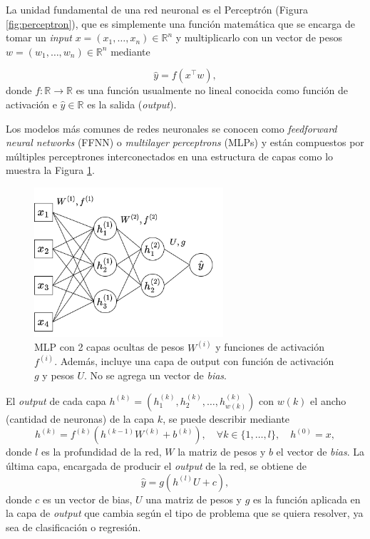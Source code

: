 \vspace{0.2cm}

La unidad fundamental de una red neuronal es el Perceptrón (Figura \ref{fig:perceptron}), que es simplemente una función matemática que se encarga de tomar un \textit{input} $x = (x_1 , \dots , x_n) \in \mathbb{R}^n$  y multiplicarlo con un vector de pesos $w = (w_1 , \dots , w_n) \in \mathbb{R}^n$ mediante

\[
\hat{y} = f(x^{\top}w) , 
\]
donde $f: \mathbb{R} \rightarrow \mathbb{R}$ es una función usualmente no lineal conocida como función de activación e $\hat{y} \in \mathbb{R}$ es la salida (\textit{output}).  

\vspace{0.2cm}

Los modelos más comunes de redes neuronales se conocen como \textit{feedforward neural networks} (FFNN) o \textit{multilayer perceptrons} (MLPs) y están compuestos por múltiples perceptrones interconectados en una estructura de capas como lo muestra la Figura \ref{fig:MLPs}.

\begin{figure}[ht]
    \centering
    \includegraphics[width=7cm]{img/tesis/MLPs.png}
    \caption{MLP con 2 capas ocultas de pesos $W^{(i)}$ y funciones de activación $f^{(i)}$. Además, incluye una capa de output con función de activación $g$ y pesos $U$. No se agrega un vector de \textit{bias}. }
    \label{fig:MLPs}
\end{figure}

El \textit{output} de cada capa $h^{(k)} = (h^{(k)}_1 , h^{(k)}_2 , \dots , h^{(k)}_{w(k)})$ con $w(k)$ el ancho (cantidad de neuronas) de la capa $k$, se puede describir mediante 
\[
h^{(k)} = f^{(k)}(h^{(k-1)}W^{(k)}  + b^{(k)} ), \quad \forall k \in \{ 1 , \dots , l \} , \quad h^{(0)} = x ,   
\]
donde $l$ es la profundidad de la red, $W$ la matriz de pesos y $b$ el vector de \textit{bias}. La última capa, encargada de producir el \textit{output} de la red, se obtiene de 
\[
\hat{y} = g(h^{(l)}U + c ) , 
\]
donde $c$ es un vector de bias, $U$ una matriz de pesos y $g$ es la función aplicada en la capa de \textit{output} que cambia según el tipo de problema que se quiera resolver, ya sea de clasificación o regresión. 

